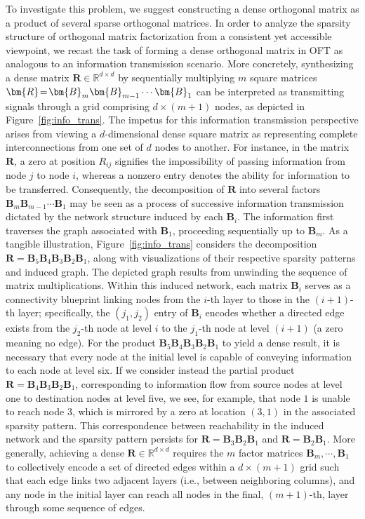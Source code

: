 To investigate this problem, we suggest constructing a dense orthogonal matrix as a product of several sparse orthogonal matrices. In order to analyze the sparsity structure of orthogonal matrix factorization from a consistent yet accessible viewpoint, we recast the task of forming a dense orthogonal matrix in OFT as analogous to an information transmission scenario. More concretely, synthesizing a dense matrix $\bm{R}\in\mathbb{R}^{d\times d}$ by sequentially multiplying $m$ square matrices $\thickmuskip=2mu \medmuskip=2mu \bm{R}=\bm{B}_m\bm{B}_{m-1}\cdots\bm{B}_1$ can be interpreted as transmitting signals through a grid comprising $d\times (m+1)$ nodes, as depicted in Figure~\ref{fig:info_trans}. The impetus for this information transmission perspective arises from viewing a $d$-dimensional dense square matrix as representing complete interconnections from one set of $d$ nodes to another. For instance, in the matrix $\bm{R}$, a zero at position $R_{ij}$ signifies the impossibility of passing information from node $j$ to node $i$, whereas a nonzero entry denotes the ability for information to be transferred. Consequently, the decomposition of $\bm{R}$ into several factors $\bm{B}_m\bm{B}_{m-1}\cdots\bm{B}_1$ may be seen as a process of successive information transmission dictated by the network structure induced by each $\bm{B}_i$. The information first traverses the graph associated with $\bm{B}_1$, proceeding sequentially up to $\bm{B}_m$. As a tangible illustration, Figure~\ref{fig:info_trans} considers the decomposition $\bm{R}=\bm{B}_5\bm{B}_4\bm{B}_3\bm{B}_2\bm{B}_1$, along with visualizations of their respective sparsity patterns and induced graph. The depicted graph results from unwinding the sequence of matrix multiplications. Within this induced network, each matrix $\bm{B}_i$ serves as a connectivity blueprint linking nodes from the $i$-th layer to those in the $(i+1)$-th layer; specifically, the $(j_1,j_2)$ entry of $\bm{B}_i$ encodes whether a directed edge exists from the $j_2$-th node at level $i$ to the $j_1$-th node at level $(i+1)$ (a zero meaning no edge). For the product $\bm{B}_5\bm{B}_4\bm{B}_3\bm{B}_2\bm{B}_1$ to yield a dense result, it is necessary that every node at the initial level is capable of conveying information to each node at level six. If we consider instead the partial product $\bm{R}=\bm{B}_4\bm{B}_3\bm{B}_2\bm{B}_1$, corresponding to information flow from source nodes at level one to destination nodes at level five, we see, for example, that node $1$ is unable to reach node $3$, which is mirrored by a zero at location $(3,1)$ in the associated sparsity pattern. This correspondence between reachability in the induced network and the sparsity pattern persists for $\bm{R}=\bm{B}_3\bm{B}_2\bm{B}_1$ and $\bm{R}=\bm{B}_2\bm{B}_1$. More generally, achieving a dense $\bm{R}\in\mathbb{R}^{d\times d}$ requires the $m$ factor matrices $\bm{B}_m,\cdots,\bm{B}_1$ to collectively encode a set of directed edges within a $d\times (m+1)$ grid such that each edge links two adjacent layers (i.e., between neighboring columns), and any node in the initial layer can reach all nodes in the final, $(m+1)$-th, layer through some sequence of edges.

